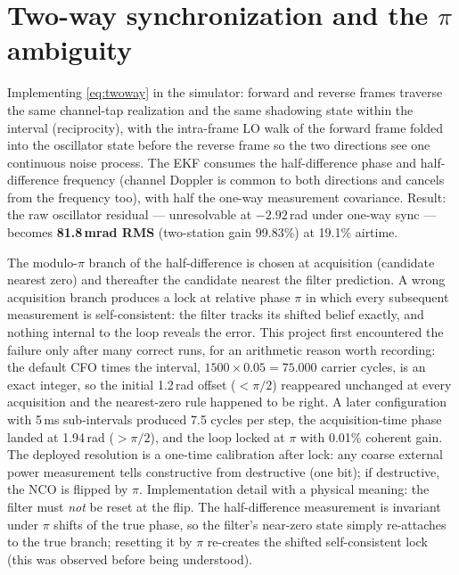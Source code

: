 \documentclass[10pt]{article}
\begin{document}
\section{Two-way synchronization and the $\pi$ ambiguity}
\label{sec:pi}
Implementing \eqref{eq:twoway} in the simulator: forward and reverse
frames traverse the same channel-tap realization and the same shadowing
state within the interval (reciprocity), with the intra-frame LO walk of
the forward frame folded into the oscillator state before the reverse
frame so the two directions see one continuous noise process. The EKF
consumes the half-difference phase and half-difference frequency
(channel Doppler is common to both directions and cancels from the
frequency too), with half the one-way measurement covariance. Result:
the raw oscillator residual --- unresolvable at $-2.92$\,rad under
one-way sync --- becomes \textbf{81.8\,mrad RMS} (two-station gain
99.83\%) at 19.1\% airtime.

The modulo-$\pi$ branch of the half-difference is chosen at acquisition
(candidate nearest zero) and thereafter the candidate nearest the filter
prediction. A wrong acquisition branch produces a lock at relative phase
$\pi$ in which every subsequent measurement is self-consistent: the
filter tracks its shifted belief exactly, and nothing internal to the
loop reveals the error. This project first encountered the failure only
after many correct runs, for an arithmetic reason worth recording: the
default CFO times the interval, $1500\times0.05=75.000$ carrier cycles,
is an exact integer, so the initial 1.2\,rad offset ($<\pi/2$)
reappeared unchanged at every acquisition and the nearest-zero rule
happened to be right. A later configuration with 5\,ms sub-intervals
produced 7.5 cycles per step, the acquisition-time phase landed at
1.94\,rad ($>\pi/2$), and the loop locked at $\pi$ with 0.01\% coherent
gain. The deployed resolution is a one-time calibration after lock: any
coarse external power measurement tells constructive from destructive
(one bit); if destructive, the NCO is flipped by $\pi$. Implementation
detail with a physical meaning: the filter must \emph{not} be reset at
the flip. The half-difference measurement is invariant under $\pi$
shifts of the true phase, so the filter's near-zero state simply
re-attaches to the true branch; resetting it by $\pi$ re-creates the
shifted self-consistent lock (this was observed before being understood).
\end{document}

